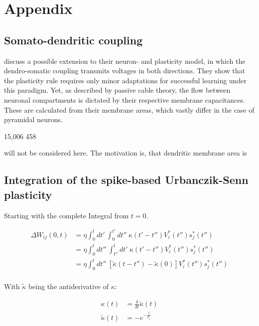
\chapter{Appendix}



\section{Somato-dendritic coupling}\label{sec-somato-dendr}

\cite{urbanczik2014learning} discuss a possible extension to their neuron- and plasticity model, in which the
dendro-somatic coupling transmits voltages in both directions. They show that the plasticity rule requires only minor
adaptations for successful learning under this paradigm. Yet, as described by passive cable theory, the flow between
neuronal compartments is dictated by their respective membrane capacitances. These are calculated from their membrane
areas, which vastly differ in the case of pyramidal neurons. 


15,006 458


will not be considered here. The motivation is, that dendritic membrane area is


\section{Integration of the spike-based Urbanczik-Senn plasticity}



Starting with the complete Integral from $t=0$.

\begin{align}
  \Delta W_{ij}(0,t) & =\eta \int_0^t dt' \  \int_0^{t'} dt'' \ \kappa(t'-t'') V_i^\ast (t'') s_j^\ast (t'')                          \\
                     & = \eta \int_0^t dt'' \  \int_{t''}^{t} dt' \ \kappa(t'-t'') V_i^\ast (t'') s_j^\ast (t'')                      \\
                     & = \eta \int_0^t dt'' \  \left[ \tilde{\kappa}(t-t'') - \tilde{\kappa}(0) \right] V_i^\ast (t'') s_j^\ast (t'') \\
\end{align}

With $\tilde{\kappa}$ being the antiderivative of $\kappa$:

\begin{align}
  \kappa(t)         & = \frac{\delta}{\delta t} \tilde{\kappa}(t) \\
  \tilde{\kappa}(t) & = - e^{-\frac{t}{t_{\kappa}}}               \\
\end{align}

